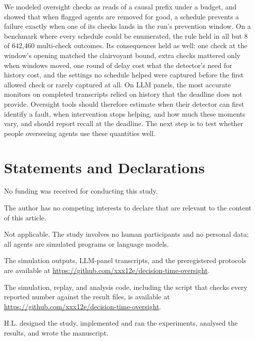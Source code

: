 \documentclass[pdflatex,sn-mathphys-num]{sn-jnl}
\theoremstyle{thmstyleone}%
\begin{document}
We modeled oversight checks as reads of a causal prefix under a budget, and showed that when flagged agents are removed for good, a schedule prevents a failure exactly when one of its checks lands in the run's prevention window. On a benchmark where every schedule could be enumerated, the rule held in all but 8 of 642{,}460 multi-check outcomes. Its consequences held as well: one check at the window's opening matched the clairvoyant bound, extra checks mattered only when windows moved, one round of delay cost what the detector's need for history cost, and the settings no schedule helped were captured before the first allowed check or rarely captured at all. On LLM panels, the most accurate monitors on completed transcripts relied on history that the deadline does not provide. Oversight tools should therefore estimate when their detector can first identify a fault, when intervention stops helping, and how much these moments vary, and should report recall at the deadline. The next step is to test whether people overseeing agents use these quantities well.

\backmatter

\section*{Statements and Declarations}

 No funding was received for conducting this study.

 The author has no competing interests to declare that are relevant to the content of this article.

 Not applicable. The study involves no human participants and no personal data; all agents are simulated programs or language models.

 The simulation outputs, LLM-panel transcripts, and the preregistered protocols are available at \url{https://github.com/xxx12e/decision-time-oversight}.

 The simulation, replay, and analysis code, including the script that checks every reported number against the result files, is available at \url{https://github.com/xxx12e/decision-time-oversight}.

 H.L. designed the study, implemented and ran the experiments, analysed the results, and wrote the manuscript.


\end{document}
